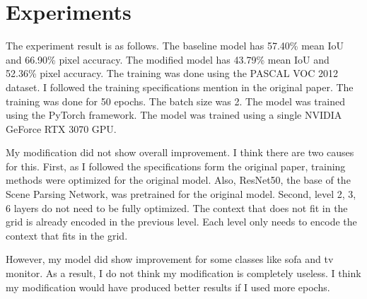 \documentclass[10pt,twocolumn,letterpaper]{article}
\begin{document}
\section{Experiments}
\label{sec:experiments}

The experiment result is as follows. The baseline model has 57.40\% mean IoU and 66.90\% pixel accuracy. The modified model has 43.79\% mean IoU and 52.36\% pixel accuracy. The training was done using the PASCAL VOC 2012 dataset. I followed the training specifications mention in the original paper\cite{zhao2017pyramid}. The training was done for 50 epochs. The batch size was 2. The model was trained using the PyTorch framework. The model was trained using a single NVIDIA GeForce RTX 3070 GPU.

My modification did not show overall improvement. I think there are two causes for this. First, as I followed the specifications form the original paper, training methods were optimized for the original model. Also, ResNet50, the base of the Scene Parsing Network, was pretrained for the original model. Second, level 2, 3, 6 layers do not need to be fully optimized. The context that does not fit in the grid is already encoded in the previous level. Each level only needs to encode the context that fits in the grid.

However, my model did show improvement for some classes like sofa and tv monitor. As a result, I do not think my modification is completely useless. I think my modification would have produced better results if I used more epochs.



{\small


}
\end{document}

